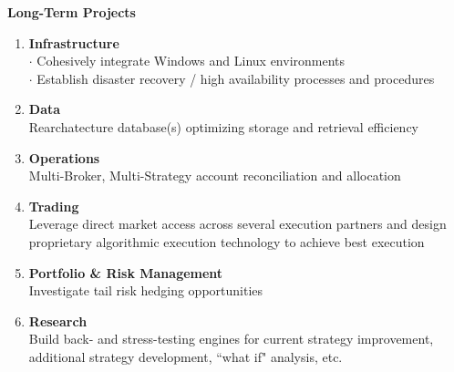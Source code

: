 \documentclass[6pt]{article}
\begin{document}
\textbf{\Large{Long-Term Projects}} \\
\begin{enumerate}
  \item \textbf{Infrastructure} \\
    $\cdot$ Cohesively integrate  Windows and Linux environments \\
    $\cdot$ Establish disaster recovery / high availability processes
      and procedures \\
  \item \textbf{Data} \\
    Rearchatecture database(s) optimizing storage and retrieval efficiency
  \item \textbf{Operations} \\
    Multi-Broker, Multi-Strategy account reconciliation and allocation
  \item \textbf{Trading} \\
    Leverage direct market access across several execution partners and design
    proprietary algorithmic execution technology to achieve best execution \\
  \item \textbf{Portfolio \& Risk Management} \\
    Investigate tail risk hedging opportunities
  \item \textbf{Research} \\
    Build back- and stress-testing engines for current strategy improvement,
    additional strategy development, ``what if" analysis, etc. \\
\end{enumerate}
\end{document}
